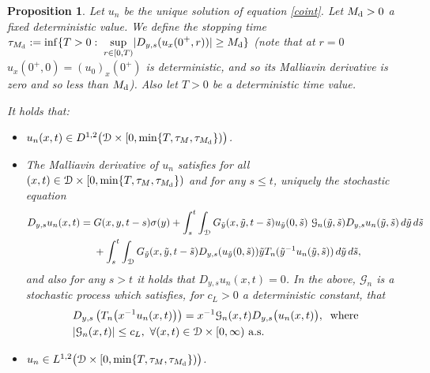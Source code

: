 \documentclass[reqno]{amsart}
\numberwithin{equation}{section}
\newtheorem{proposition}[theorem]{Proposition}
\newcommand{\cd}{\mathcal{D}}
\newcommand{\cg}{\mathcal{G}}
\begin{document}
\begin{proposition}\label{malun}
Let $u_{n}$ be the unique solution of equation \eqref{coint}. Let
$M_{\rm d}>0$ a fixed deterministic value. We define the stopping
time $\tau_{M_{\rm d }}:=\inf\{T>
0:\;\displaystyle{\sup_{r\in[0,T)}}|D_{y,s}(u_x(0^+,r))|\geq
M_{\rm d}\}$ (note that at $r=0$ $u_x(0^+,0)=(u_0)_x(0^+)$ is
deterministic, and so its Malliavin derivative is zero and so
less than $M_{\rm d}$). Also let $T>0$ be a deterministic time
value.

It holds that:
\begin{itemize}
\item[(i)]$u_n(x,t)\in D^{1,2}\bigl{(}\cd\times[0,\min\{T,\tau_M,\tau_{M_{\rm d}}\})\bigr{)}$.

\vspace{1em}

\item[(ii)]The Malliavin derivative of $u_{n}$ satisfies for all
$(x,t)\in\cd\times[0,\min\{T,\tau_M,\tau_{M_{\rm d}}\})$ and for
any $s\leq t$, uniquely the stochastic equation %
\begin{equation}\label{41}
\begin{split}
D_{y,s}u_n(x,t)=\;&G(x,y,t-s)\sigma(y)+\int_s^t\int_{\cd}G_{\Tilde{y}}(x,\Tilde{y},t-\Tilde{s})u_{\Tilde{y}}(0,\Tilde{s})
 \ \cg_{n}(\Tilde{y},\Tilde{s})D_{y,s}u_n(\Tilde{y},\Tilde{s})\,d\Tilde{y}\,d\Tilde{s}
\\
&+\int_s^t\int_{\cd}G_{\Tilde{y}}(x,\Tilde{y},t-\Tilde{s})
D_{y,s}(u_{\Tilde{y}}(0,\Tilde{s}))\Tilde{y}T_n(\Tilde{y}^{-1}u_n(\Tilde{y},\Tilde{s}))\,d\Tilde{y}\,d\Tilde{s},
\end{split}
\end{equation}
and also for any $s>t$ it holds that $D_{y,s}u_n(x,t)=0$. In
the above, $\cg_{n}$ is a stochastic process which satisfies, for
$c_L>0$ a deterministic constant, that
\begin{equation}\label{42}
\begin{split}
&D_{y,s}\left(T_n\bigl{(}x^{-1}u_n(x,t)\bigr)\right)=x^{-1}
\cg_n(x,t)D_{y,s}\bigl(u_n(x,t)\bigr),\;\;\mbox{where}\\
&|\cg_{n}(x,t)|\leq c_L,\ \forall (x,t)\in\cd\times[0,\infty) \ \text{a.s.}
\end{split}
\end{equation}
\item[(iii)] $u_n\in L^{1,2}\bigl(\cd\times[0,\min\{T,\tau_M,\tau_{M_{\rm
d}}\})\bigr)$.
\end{itemize}
\end{proposition}
\end{document}
